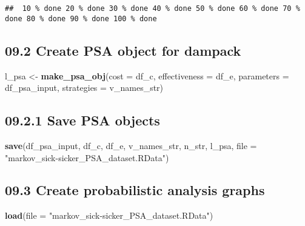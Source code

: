 \documentclass[
]{article}
\newenvironment{Shaded}{\begin{snugshade}}{\end{snugshade}}
\newcommand{\DataTypeTok}[1]{\textcolor[rgb]{0.13,0.29,0.53}{#1}}
\newcommand{\KeywordTok}[1]{\textcolor[rgb]{0.13,0.29,0.53}{\textbf{#1}}}
\newcommand{\NormalTok}[1]{#1}
\newcommand{\StringTok}[1]{\textcolor[rgb]{0.31,0.60,0.02}{#1}}
\begin{document}
\begin{verbatim}
##  10 % done 20 % done 30 % done 40 % done 50 % done 60 % done 70 % done 80 % done 90 % done 100 % done
\end{verbatim}

\hypertarget{create-psa-object-for-dampack}{%
\subsection{09.2 Create PSA object for
dampack}\label{create-psa-object-for-dampack}}

\begin{Shaded}
\begin{Highlighting}[]
\NormalTok{l_psa <-}\StringTok{ }\KeywordTok{make_psa_obj}\NormalTok{(}\DataTypeTok{cost          =}\NormalTok{ df_c, }
                      \DataTypeTok{effectiveness =}\NormalTok{ df_e, }
                      \DataTypeTok{parameters    =}\NormalTok{ df_psa_input, }
                      \DataTypeTok{strategies    =}\NormalTok{ v_names_str)}
\end{Highlighting}
\end{Shaded}

\hypertarget{save-psa-objects}{%
\subsection{09.2.1 Save PSA objects}\label{save-psa-objects}}

\begin{Shaded}
\begin{Highlighting}[]
\KeywordTok{save}\NormalTok{(df_psa_input, df_c, df_e, v_names_str, n_str, l_psa,}
     \DataTypeTok{file =} \StringTok{"markov_sick-sicker_PSA_dataset.RData"}\NormalTok{)}
\end{Highlighting}
\end{Shaded}

\hypertarget{create-probabilistic-analysis-graphs}{%
\subsection{09.3 Create probabilistic analysis
graphs}\label{create-probabilistic-analysis-graphs}}

\begin{Shaded}
\begin{Highlighting}[]
\KeywordTok{load}\NormalTok{(}\DataTypeTok{file =} \StringTok{"markov_sick-sicker_PSA_dataset.RData"}\NormalTok{)}
\end{Highlighting}
\end{Shaded}
\end{document}
